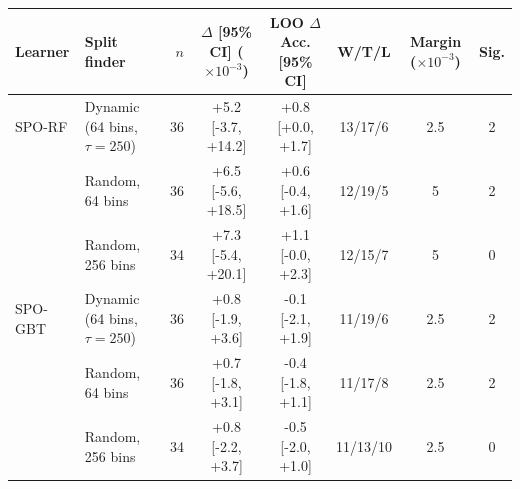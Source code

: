 \begin{tabular}{llrccccc}
\toprule
Learner & Split finder & $n$ & $\Delta$ [95\% CI] ($\times 10^{-3}$) & LOO $\Delta$ Acc. [95\% CI] & W/T/L & Margin ($\times 10^{-3}$) & Sig. \\
\midrule
SPO-RF & Dynamic (64 bins, $\tau{=}250$) & 36 & +5.2 [-3.7, +14.2] & +0.8 [+0.0, +1.7] & 13/17/6 & 2.5 & 2 \\
 & Random, 64 bins & 36 & +6.5 [-5.6, +18.5] & +0.6 [-0.4, +1.6] & 12/19/5 & 5 & 2 \\
 & Random, 256 bins & 34 & +7.3 [-5.4, +20.1] & +1.1 [-0.0, +2.3] & 12/15/7 & 5 & 0 \\
\midrule
SPO-GBT & Dynamic (64 bins, $\tau{=}250$) & 36 & +0.8 [-1.9, +3.6] & -0.1 [-2.1, +1.9] & 11/19/6 & 2.5 & 2 \\
 & Random, 64 bins & 36 & +0.7 [-1.8, +3.1] & -0.4 [-1.8, +1.1] & 11/17/8 & 2.5 & 2 \\
 & Random, 256 bins & 34 & +0.8 [-2.2, +3.7] & -0.5 [-2.0, +1.0] & 11/13/10 & 2.5 & 0 \\
\bottomrule
\end{tabular}

